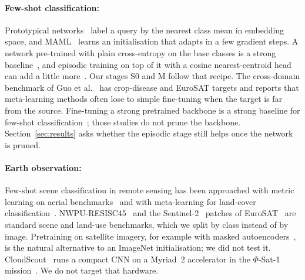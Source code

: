 \paragraph{Few-shot classification:}
Prototypical networks~\cite{snell2017proto} label a query by the nearest class mean in embedding space, and MAML~\cite{finn2017maml} learns an initialisation that adapts in a few gradient steps. A network pre-trained with plain cross-entropy on the base classes is a strong baseline~\cite{chen2019closer,tian2020rethinking}, and episodic training on top of it with a cosine nearest-centroid head can add a little more~\cite{chen2021metabaseline}. Our stages S0 and M follow that recipe. The cross-domain benchmark of Guo et al.~\cite{guo2020bscd} has crop-disease and EuroSAT targets and reports that meta-learning methods often lose to simple fine-tuning when the target is far from the source. Fine-tuning a strong pretrained backbone is a strong baseline for few-shot classification~\cite{dhillon2020baseline,hu2022pushing}; those studies do not prune the backbone. Section~\ref{sec:results} asks whether the episodic stage still helps once the network is pruned.

\paragraph{Earth observation:}
Few-shot scene classification in remote sensing has been approached with metric learning on aerial benchmarks~\cite{li2021rsmetanet} and with meta-learning for land-cover classification~\cite{russwurm2020meta}. NWPU-RESISC45~\cite{cheng2017resisc} and the Sentinel-2~\cite{drusch2012sentinel2} patches of EuroSAT~\cite{helber2019eurosat} are standard scene and land-use benchmarks, which we split by class instead of by image. Pretraining on satellite imagery, for example with masked autoencoders~\cite{cong2022satmae}, is the natural alternative to an ImageNet initialisation; we did not test it. CloudScout~\cite{giuffrida2020cloudscout} runs a compact CNN on a Myriad~2 accelerator in the $\Phi$-Sat-1 mission~\cite{giuffrida2022phisat}. We do not target that hardware.

